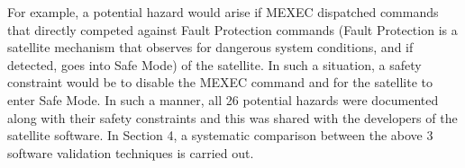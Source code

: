 \documentclass[journal, onecolumn]{IEEEtran}
\begin{document}
	\newline \newline
	For example, a potential hazard would arise if MEXEC dispatched commands that directly competed against Fault Protection commands (Fault Protection is a satellite mechanism that observes for dangerous system conditions, and if detected, goes into Safe Mode) of the satellite. In such a situation, a safety constraint would be to disable the MEXEC command and for the satellite to enter Safe Mode.
	\newline \newline
	In such a manner, all 26 potential hazards were documented along with their safety constraints and this was shared with the developers of the satellite software.
	\newline \newline
	In Section 4, a systematic comparison between the above 3 software validation techniques is carried out.
	
\end{document}
